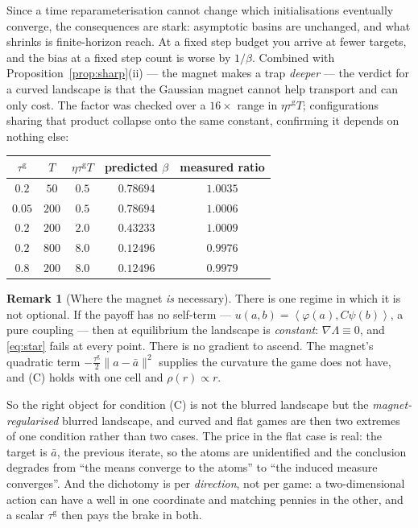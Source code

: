 \documentclass[11pt]{article}
\theoremstyle{definition}
\newtheorem{remark}[theorem]{Remark}
\newcommand{\ip}[2]{\left\langle #1, #2 \right\rangle}
\begin{document}
Since a time reparameterisation cannot change which initialisations eventually
converge, the consequences are stark: asymptotic basins are unchanged, and what
shrinks is finite-horizon reach. At a fixed step budget you arrive at fewer
targets, and the bias at a fixed step count is worse by $1/\beta$. Combined with
Proposition~\ref{prop:sharp}(ii) --- the magnet makes a trap \emph{deeper} --- the
verdict for a curved landscape is that the Gaussian magnet cannot help transport
and can only cost. The factor was checked over a $16\times$ range in
$\eta\tau^{\mathrm g}T$; configurations sharing that product collapse onto the
same constant, confirming it depends on nothing else:

\begin{center}
\begin{tabular}{ccccc}
\hline
$\tau^{\mathrm g}$ & $T$ & $\eta\tau^{\mathrm g}T$ & predicted $\beta$ &
  measured ratio\\
\hline
$0.2$ & $50$ & $0.5$ & $0.78694$ & $1.0035$\\
$0.05$ & $200$ & $0.5$ & $0.78694$ & $1.0006$\\
$0.2$ & $200$ & $2.0$ & $0.43233$ & $1.0009$\\
$0.2$ & $800$ & $8.0$ & $0.12496$ & $0.9976$\\
$0.8$ & $200$ & $8.0$ & $0.12496$ & $0.9979$\\
\hline
\end{tabular}
\end{center}

\begin{remark}[Where the magnet \emph{is} necessary]\label{rem:flat}
There is one regime in which it is not optional. If the payoff has no self-term
--- $u(a,b) = \ip{\varphi(a)}{C\psi(b)}$, a pure coupling --- then at equilibrium
the landscape is \emph{constant}: $\nabla\Lambda \equiv 0$, and \eqref{eq:star}
fails at every point. There is no gradient to ascend. The magnet's quadratic term
$-\tfrac{\tau^{\mathrm g}}{2}\|a - \bar a\|^2$ supplies the curvature the game does
not have, and (C) holds with one cell and $\rho(r) \propto r$.

So the right object for condition (C) is not the blurred landscape but the
\emph{magnet-regularised} blurred landscape, and curved and flat games are then
two extremes of one condition rather than two cases. The price in the flat case is
real: the target is $\bar a$, the previous iterate, so the atoms are unidentified
and the conclusion degrades from ``the means converge to the atoms'' to ``the
induced measure converges''. And the dichotomy is per \emph{direction}, not per
game: a two-dimensional action can have a well in one coordinate and matching
pennies in the other, and a scalar $\tau^{\mathrm g}$ then pays the brake in both.
\end{remark}
\end{document}
